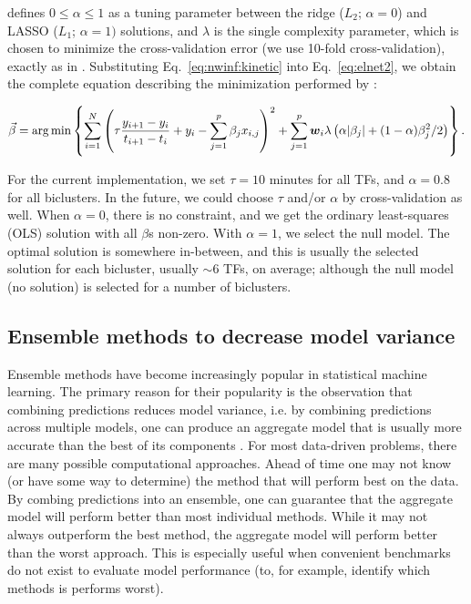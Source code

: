 \noindent defines $0\leq \alpha \leq 1$ as a tuning parameter between the ridge ($L_2$; $\alpha=0$) and LASSO ($L_1$; $\alpha=1)$ solutions, and $\lambda$ is the single complexity parameter, which is chosen to minimize the cross-validation error (we use 10-fold cross-validation), exactly as in \cite{bonneau_inferelator:_2006}. Substituting Eq.~\ref{eq:nwinf:kinetic} into Eq.~\ref{eq:elnet2}, we obtain the complete equation describing the minimization performed by \nwinf:

\begin{equation}
\label{eq:elnet3}
 \vec{\beta} = \arg \min \left\{ \sum^N_{i = 1} 
 \left( \tau\frac{y_{i+1}-y_{i}}{t_{i+1}-t_i} + y_{i}- \sum_{j=1}^{p} \beta_j x_{i,j} \right)^2 + \sum_{j = 1}^p
   \boldsymbol{w}_i \lambda \left( \alpha | \beta_j | + (1-\alpha) \beta^2_j /2\right) \right\}.
\end{equation}

\noindent For the current implementation, we set $\tau=10$ minutes for all TFs, and $\alpha=0.8$ for all biclusters. In the future, we could choose $\tau$ and/or $\alpha$ by cross-validation as well. When $\alpha=0$, there is no constraint, and we get the ordinary least-squares (OLS) solution with all $\beta$s non-zero. With $\alpha=1$, we select the null model. The optimal solution is somewhere in-between, and this is usually the selected solution for each bicluster, usually $\sim 6$ TFs, on average; although the null model (no solution) is selected for a number of biclusters.

\subsection{Ensemble methods to decrease model variance}

Ensemble methods have become increasingly popular in statistical machine learning. The primary reason for their popularity is the observation that combining predictions reduces model variance, i.e. by combining predictions across multiple models, one can produce an aggregate model that is usually more accurate than the best of its components \cite{seni_ensemble_2010}. For most data-driven problems, there are many possible computational approaches. Ahead of time one may not know (or have some way to determine) the method that will perform best on the data. By combing predictions into an ensemble, one can guarantee that the aggregate model will perform better than most individual methods. While it may not always outperform the best method, the aggregate model will perform better than the worst approach. This is especially useful when convenient benchmarks do not exist to evaluate model performance (to, for example, identify which methods is performs worst). 

